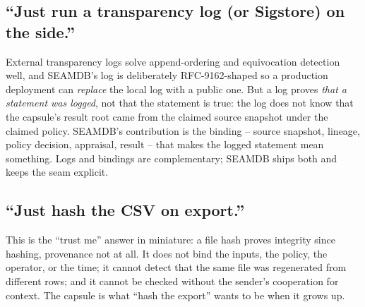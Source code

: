 \documentclass[11pt]{article}
\begin{document}
\subsection{``Just run a transparency log (or Sigstore) on the side.''}
External transparency logs solve append-ordering and equivocation detection
well, and SEAMDB's log is deliberately RFC-9162-shaped so a production
deployment can \emph{replace} the local log with a public one. But a log
proves \emph{that a statement was logged}, not that the statement is true:
the log does not know that the capsule's result root came from the claimed
source snapshot under the claimed policy. SEAMDB's contribution is the
binding -- source snapshot, lineage, policy decision, appraisal, result --
that makes the logged statement mean something. Logs and bindings are
complementary; SEAMDB ships both and keeps the seam explicit.

\subsection{``Just hash the CSV on export.''}
This is the ``trust me'' answer in miniature: a file hash proves integrity
since hashing, provenance not at all. It does not bind the inputs, the
policy, the operator, or the time; it cannot detect that the same file was
regenerated from different rows; and it cannot be checked without the
sender's cooperation for context. The capsule is what ``hash the export''
wants to be when it grows up.
\end{document}
